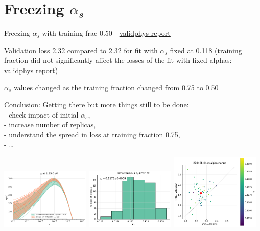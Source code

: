 \documentclass[aspectratio=169,10pt]{beamer}
\begin{document}
\section*{Freezing $\alpha_s$}

\begin{frame}[t]{Freezing $\alpha_s$ with training frac 0.50 - \underline{\href{https://vp.nnpdf.science/J-wRSP3IRxeAMYoImWktBQ==/}{validphys report}}}

  Validation loss 2.32 compared to 2.32 for fit with $\alpha_s$ fixed at 0.118 (training fraction did not significantly affect the losses of the fit with fixed alphas: \underline{\href{https://vp.nnpdf.science/K9yvnY0wQGuUSmj2wsRXNQ==/}{validphys report}})\\\vspace*{0.5em}

  $\alpha_s$ values changed as the training fraction changed from 0.75 to 0.50\\\vspace*{0.5em}

  Conclusion: Getting there but more things still to be done:\\
  - check impact of initial $\alpha_s$, \\
  - increase number of replicas, \\
  - understand the spread in loss at training fraction 0.75, \\
  - \ldots

  \vspace*{-8.5mm}
  \includegraphics[width=0.32\textwidth]{PDFnormalize0_Basespecs0_PDFscalespecs0_plot_pdfs_g_frac50.pdf}  
  \includegraphics[width=0.32\textwidth]{alphas_hist_frac50.pdf}
  \includegraphics[width=0.32\textwidth]{plot_training_validation_frac50.pdf}

\end{frame}



% 
\end{document}

